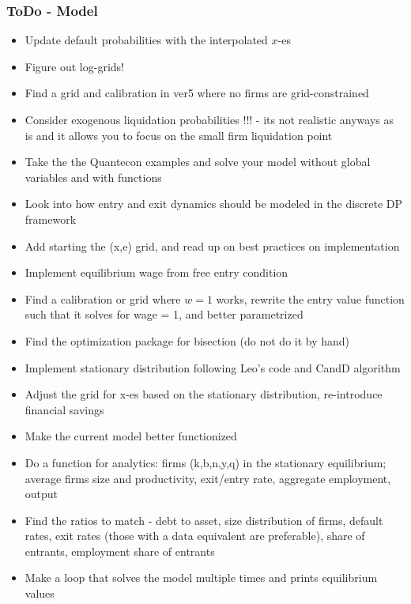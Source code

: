 \documentclass[12pt]{article}
\begin{document}
\subsubsection*{ToDo - Model}
\begin{itemize}\setlength\itemsep{0em} \small
    \item Update default probabilities with the interpolated $x$-es \checkmark
    \item Figure out log-grids! \checkmark
    \item Find a grid and calibration in ver5 where no firms are grid-constrained \checkmark
    \item Consider exogenous liquidation probabilities !!! - its not realistic anyways as is and it allows you to focus on the small firm liquidation point \checkmark
    \item Take the the Quantecon examples and solve your model without global variables and with functions \checkmark
    \item Look into how entry and exit dynamics should be modeled in the discrete DP framework \checkmark
    \item Add starting the (x,e) grid, and read up on best practices on implementation \checkmark
    \item Implement equilibrium wage from free entry condition \checkmark
    \item Find a calibration or grid where $w=1$ works, rewrite the entry value function such that it solves for wage = 1, and better parametrized \checkmark
    \item Find the optimization package for bisection (do not do it by hand) \checkmark
    \item Implement stationary distribution following Leo's code and CandD algorithm \checkmark
    \item Adjust the grid for x-es based on the stationary distribution, re-introduce financial savings \checkmark
    \item Make the current model better functionized \checkmark
    \item Do a function for analytics: firms (k,b,n,y,q) in the stationary equilibrium; average firms size and productivity, exit/entry rate, aggregate employment, output \checkmark
    \item Find the ratios to match - debt to asset, size distribution of firms, default rates, exit rates (those with a data equivalent are preferable), share of entrants, employment share of  entrants \checkmark
    \item Make a loop that solves the model multiple times and prints equilibrium values \checkmark

\end{itemize}
\end{document}
